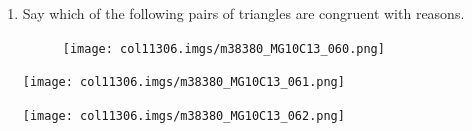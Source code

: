 \begin{enumerate}[noitemsep,
label=\textbf{\arabic*}. ]
        
\label{m38380*uid126}\item Say which of the following pairs of triangles are
congruent with reasons.
    \setcounter{subfigure}{0}


	\begin{figure}[H] %
    \begin{center}
   
\label{m38380*id320512!!!underscore!!!media}\label{
m38380*id320512!!!underscore!!!printimage}\texttt{[image: col11306.imgs/m38380\_MG10C13\_060.png]} %
        
      \vspace{2pt}
    \vspace{.1in}
    
    \end{center}

 \end{figure}   

    \addtocounter{footnote}{-0}


\label{m38380*id320530!!!underscore!!!media}\label{
m38380*id320530!!!underscore!!!printimage}\texttt{[image: 
col11306.imgs/m38380\_MG10C13\_061.png]} %
        
    




%   
\label{m38380*id320548!!!underscore!!!media}\label{
m38380*id320548!!!underscore!!!printimage}\texttt{[image: 
col11306.imgs/m38380\_MG10C13\_062.png]} %
        

\end{enumerate}
